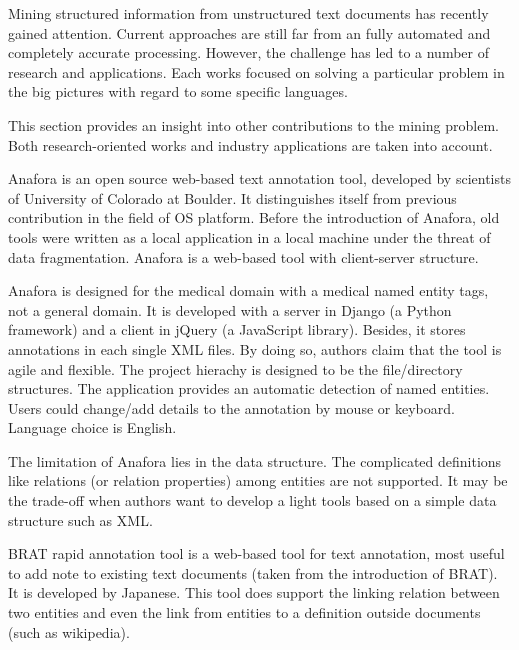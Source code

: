 
Mining structured information from unstructured text documents has recently gained attention. Current approaches are still 
far from an fully automated and completely accurate processing. However, the challenge has led to a number of research and 
applications. Each works focused on solving a particular problem in the big pictures with regard to some specific languages. 

This section provides an insight into other contributions to the mining problem. Both research-oriented works and 
industry applications are taken into account.


Anafora is an open source web-based text annotation tool, developed by scientists of  University of Colorado at Boulder. It 
distinguishes itself from previous contribution in the field of OS platform. Before the introduction of Anafora, old tools 
were written as a local application in a local machine under the threat of data fragmentation. Anafora is a web-based tool 
with client-server structure. %


Anafora is designed for the medical domain with a medical named entity tags, not a general domain. It is developed with a server in Django (a Python framework) and a client in jQuery (a JavaScript 
library). Besides, it stores annotations in each single XML files. By doing so, authors claim that the tool is agile and 
flexible. The project hierachy is designed to be the file/directory structures. The application provides an automatic detection
of named entities. Users could change/add details to the annotation by mouse or keyboard. Language choice is English.

The limitation of Anafora lies in the data structure. The complicated deﬁnitions like relations (or relation properties) 
among entities are not supported. It may be the trade-off when authors want to develop a light tools based on a simple
data structure such as XML.


BRAT rapid annotation tool is a web-based tool for text annotation, most useful to add note to existing text documents 
(taken from the introduction of BRAT). It is developed by Japanese. This tool does support the linking relation between 
two entities and even the link 
from entities to a definition outside documents (such as wikipedia).


